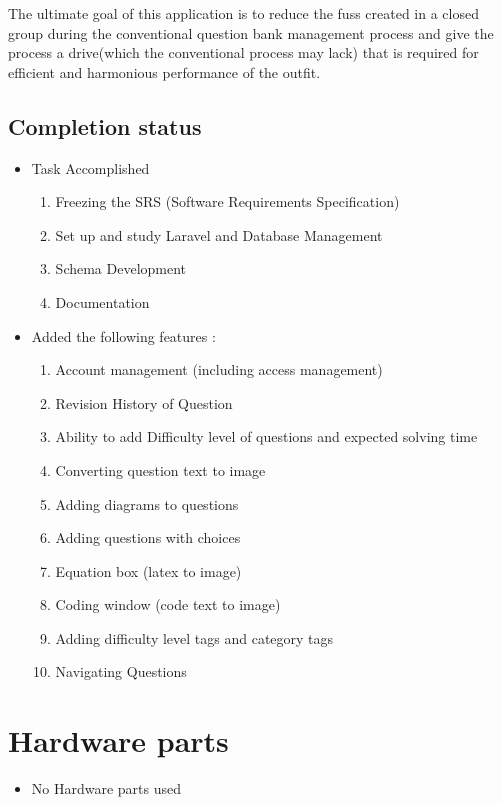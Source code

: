 \documentclass[a4paper,12pt,oneside]{book}
\begin{document}
The ultimate goal of this application is to reduce the fuss created in a closed group during the conventional question bank management process and give the process a drive(which the conventional process may lack) that is required for efficient and harmonious performance of the outfit. \\

\vspace{2in}

\subsection*{Completion status}
\begin{itemize}
	\item Task Accomplished
		\begin{enumerate}
			\item Freezing the SRS (Software Requirements Specification) 
			\item Set up and study Laravel and Database Management
			\item Schema Development
			\item Documentation
		\end{enumerate}
	\item Added the following features :
	    \begin{enumerate}
	        \item Account management (including access management)
			\item Revision History of Question
			\item Ability to add Difficulty level of questions and expected solving time 
			\item Converting question text to image
			\item Adding diagrams to questions 
			\item Adding questions with choices 
			\item Equation box (latex to image) 
			\item Coding window (code text to image)
			\item Adding difficulty level tags and category tags 
			\item Navigating Questions
	    \end{enumerate}
\end{itemize}

\vspace{1.5in}
\section{Hardware parts}
\begin{itemize}
  \item No Hardware  parts used
\end{itemize}
\end{document}
